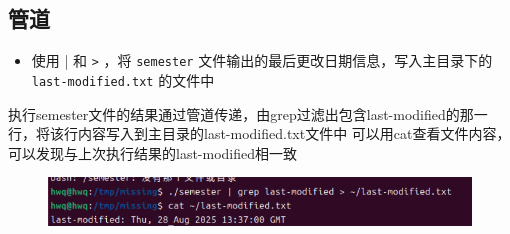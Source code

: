 \documentclass[a4paper, 12pt]{article}
\begin{document}
\subsection{管道}
\begin{itemize}
    \item 使用 \verb||| 和 \verb|>| ，将 \verb|semester| 文件输出的最后更改日期信息，写入主目录下的 \verb|last-modified.txt| 的文件中
\end{itemize}

执行semester文件的结果通过管道传递，由grep过滤出包含last-modified的那一行，将该行内容写入到主目录的last-modified.txt文件中
可以用cat查看文件内容，可以发现与上次执行结果的last-modified相一致
\begin{figure}[H]
     \centering
     \includegraphics[width=1\linewidth]{shell10.png}
\end{figure}
\end{document}
